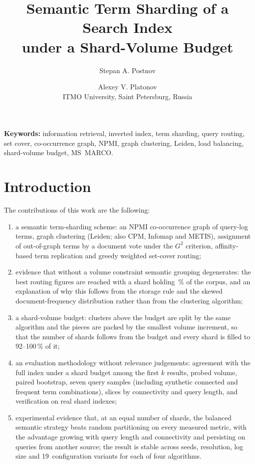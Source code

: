 \documentclass[11pt, a4paper]{article}
\title{Semantic Term Sharding of a Search Index\\ under a Shard-Volume Budget}
\author{Stepan A. Postnov \and Alexey V. Platonov\\
	\small ITMO University, Saint Petersburg, Russia}
\date{}
\newif\ifdraftnotes
\newcommand{\todo}[1]{\ifdraftnotes\par\noindent{\small\color{red!75!black}\textbf{TODO:} #1}\par\fi}
\begin{document}
\maketitle

\begin{abstract}
\todo{Abstract (150--250 words): subject, method, main results with numbers (see the Russian abstract notes in \texttt{article.tex}), significance.}
\end{abstract}

\noindent\textbf{Keywords:} information retrieval, inverted index, term sharding, query routing, set cover, co-occurrence graph, NPMI, graph clustering, Leiden, load balancing, shard-volume budget, MS~MARCO.

\section{Introduction}

\todo{Text: context (document and term sharding), the problem of hash assignment (a multi-term query hits several shards), the idea (clusters of the co-occurrence graph), the main motivation (clusters degenerate without a volume budget), the solution (shard-volume budget), the result in one sentence, paper outline. Materials: none.}

The contributions of this work are the following:
\begin{enumerate}
	\item a semantic term-sharding scheme: an NPMI co-occurrence graph of query-log terms, graph clustering (Leiden; also CPM, Infomap and METIS), assignment of out-of-graph terms by a document vote under the $G^2$ criterion, affinity-based term replication and greedy weighted set-cover routing;
	\item evidence that without a volume constraint semantic grouping degenerates: the best routing figures are reached with a shard holding \affRthreeLargest\,\% of the corpus, and an explanation of why this follows from the storage rule and the skewed document-frequency distribution rather than from the clustering algorithm;
	\item a shard-volume budget: clusters above the budget are split by the same algorithm and the pieces are packed by the smallest volume increment, so that the number of shards follows from the budget and every shard is filled to 92--100\,\% of it;
	\item an evaluation methodology without relevance judgements: agreement with the full index under a shard budget among the first $k$ results, probed volume, paired bootstrap, seven query samples (including synthetic connected and frequent term combinations), slices by connectivity and query length, and verification on real shard indexes;
	\item experimental evidence that, at an equal number of shards, the balanced semantic strategy beats random partitioning on every measured metric, with the advantage growing with query length and connectivity and persisting on queries from another source; the result is stable across seeds, resolution, log size and 19~configuration variants for each of four algorithms.
\end{enumerate}
\end{document}
